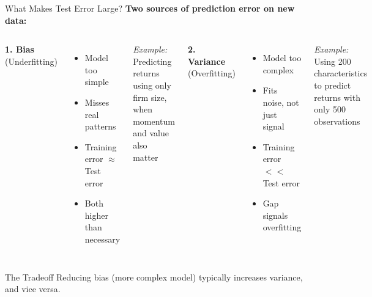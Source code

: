 \documentclass[10pt]{beamer}
\newcommand{\bad}[1]{\textcolor{AccentOrange}{#1}}
\begin{document}
\begin{frame}{What Makes Test Error Large?}
  \textbf{Two sources of prediction error on new data:}
  
  \vspace{1em}
  \begin{columns}[T]
    \textbf{1. Bias} (Underfitting)
    \begin{itemize}
      \item Model too simple
      \item Misses real patterns
      \item Training error $\approx$ Test error
      \item \bad{Both higher than necessary}
    \end{itemize}
    
    \vspace{0.5em}
    \textit{Example:} Predicting returns using only firm size, when momentum and value also matter
    
    \textbf{2. Variance} (Overfitting)
    \begin{itemize}
      \item Model too complex
      \item Fits noise, not just signal
      \item Training error $<<$ Test error
      \item \bad{Gap signals overfitting}
    \end{itemize}
    
    \vspace{0.5em}
    \textit{Example:} Using 200 characteristics to predict returns with only 500 observations
  \end{columns}
  
  \vspace{1em}
  \begin{block}{The Tradeoff}
    Reducing bias (more complex model) typically increases variance, and vice versa.
  \end{block}
\end{frame}
\end{document}

